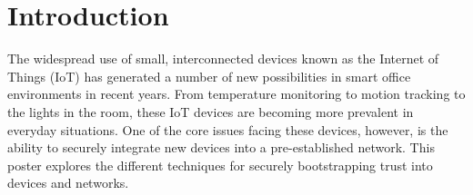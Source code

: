 \section{Introduction}

The widespread use of small, interconnected devices known as the Internet of Things (IoT) has generated a number of new possibilities in smart office environments in recent years. From temperature monitoring to motion tracking to the lights in the room, these IoT devices are becoming more prevalent in everyday situations. One of the core issues facing these devices, however, is the ability to securely integrate new devices into a pre-established network. This poster explores the different techniques for securely bootstrapping trust into devices and networks.


